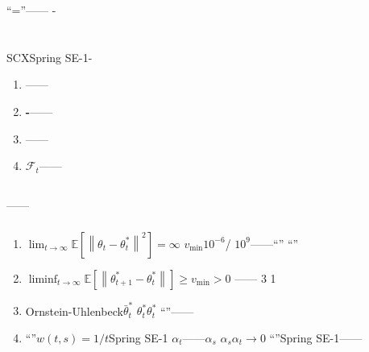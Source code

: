 \documentclass[11pt,a4paper]{article}
\theoremstyle{remark}
\newcommand{\Fforget}{\mathcal{F}}
\newcommand{\E}{\mathbb{E}}
\newcommand{\norm}[1]{\left\lVert#1\right\rVert}
\begin{document}
``=''——
-


\section{}

\subsection{}

SCXSpring SE-1-


\begin{enumerate}[label=(\arabic*)]
    \item \textbf{}\textbf{}——
    \item \textbf{-}\textbf{}——
    \item \textbf{}\textbf{}——
    \item \textbf{$\Fforget_t$}\textbf{}——
\end{enumerate}

\subsection{}

\textbf{}——

\subsubsection*{}

\begin{enumerate}[label=\textbf{\,\arabic*:}, leftmargin=*]
    \item \textbf{}
          $\lim_{t\to\infty} \E[\norm{\theta_t - \theta_t^*}^2] = \infty$
          $v_{\min}$$10^{-6}$/
          $10^9$——``''
          ``''

    \item \textbf{}
          $\liminf_{t \to \infty} \E[\norm{\theta_{t+1}^* - \theta_t^*}] \geq v_{\min} > 0$
          \textbf{}——
          3
          1\textbf{}

    \item \textbf{}
          Ornstein-Uhlenbeck$\bar{\theta}_t^*$
          $\theta_t^*$$\theta_t^*$
          ``''——\textbf{}
          

    \item \textbf{}
          ``''$w(t, s) = 1/t$Spring SE-1
          $\alpha_t$\textbf{}——$\alpha_s$
          $\alpha_s$$\alpha_t \to 0$
          ``''Spring SE-1——
          \textbf{}
\end{enumerate}
\end{document}
